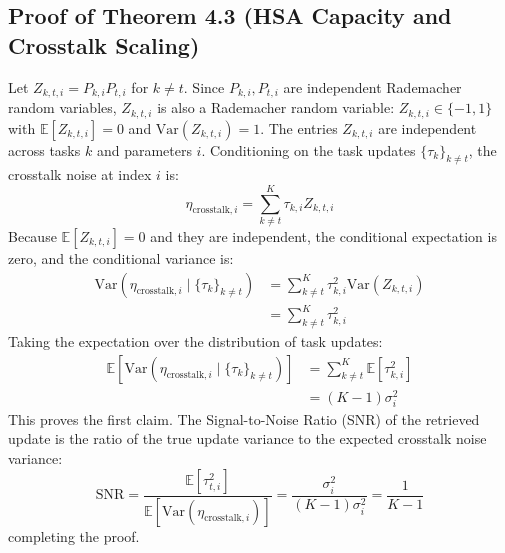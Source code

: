 \documentclass{article}
\theoremstyle{plain}
\theoremstyle{definition}
\theoremstyle{remark}
\begin{document}
\subsection{Proof of Theorem 4.3 (HSA Capacity and Crosstalk Scaling)}
\label{proof:capacity}
Let $Z_{k,t,i} = P_{k,i} P_{t,i}$ for $k \neq t$. Since $P_{k,i}, P_{t,i}$ are independent Rademacher random variables, $Z_{k,t,i}$ is also a Rademacher random variable: $Z_{k,t,i} \in \{-1, 1\}$ with $\mathbb{E}[Z_{k,t,i}] = 0$ and $\text{Var}(Z_{k,t,i}) = 1$. The entries $Z_{k,t,i}$ are independent across tasks $k$ and parameters $i$.
Conditioning on the task updates $\{\tau_k\}_{k \neq t}$, the crosstalk noise at index $i$ is:
\begin{equation}
    \eta_{\text{crosstalk}, i} = \sum_{k \neq t}^K \tau_{k,i} Z_{k,t,i}
\end{equation}
Because $\mathbb{E}[Z_{k,t,i}] = 0$ and they are independent, the conditional expectation is zero, and the conditional variance is:
\begin{align}
    \text{Var}(\eta_{\text{crosstalk}, i} \mid \{\tau_k\}_{k \neq t}) &= \sum_{k \neq t}^K \tau_{k,i}^2 \text{Var}(Z_{k,t,i}) \nonumber \\
    &= \sum_{k \neq t}^K \tau_{k,i}^2
\end{align}
Taking the expectation over the distribution of task updates:
\begin{align}
    \mathbb{E}[\text{Var}(\eta_{\text{crosstalk}, i} \mid \{\tau_k\}_{k \neq t})] &= \sum_{k \neq t}^K \mathbb{E}[\tau_{k,i}^2] \nonumber \\
    &= (K-1)\sigma_i^2
\end{align}
This proves the first claim.
The Signal-to-Noise Ratio (SNR) of the retrieved update is the ratio of the true update variance to the expected crosstalk noise variance:
\begin{equation}
    \text{SNR} = \frac{\mathbb{E}[\tau_{t,i}^2]}{\mathbb{E}[\text{Var}(\eta_{\text{crosstalk}, i})]} = \frac{\sigma_i^2}{(K-1)\sigma_i^2} = \frac{1}{K-1}
\end{equation}
completing the proof.
\end{document}
